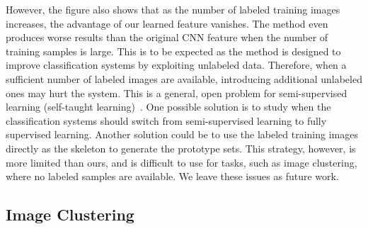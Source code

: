 \documentclass[preprint,12pt,3p]{elsarticle}
\begin{document}
However, the figure also shows that as the number of labeled training
images increases, the advantage of our learned feature vanishes. The
method even produces worse results than the original CNN feature when
the number of training samples is large.  This is to be expected as
the method is designed to improve classification systems by exploiting
unlabeled data. Therefore, when a sufficient
number of labeled images are available, introducing additional
unlabeled ones may hurt the system.  This is a general, open problem
for semi-supervised learning (self-taught
learning)~\citep{neverhurt:icml11}. One possible solution is to study
when the classification systems should switch from semi-supervised
learning to fully supervised learning. Another solution could be to
use the labeled training images directly as the skeleton to generate
the prototype sets. This strategy, however, is more limited than
ours, and is difficult to use for tasks, such as image
clustering, where no labeled samples are
available. We leave these issues as future work. 









\subsection{Image Clustering}
\end{document}
